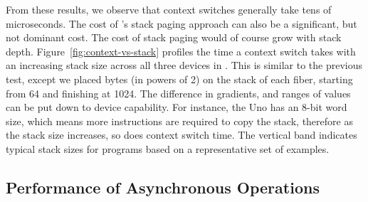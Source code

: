 From these results, we observe that context switches generally take tens of microseconds. The cost of \CON's stack paging approach can also be a significant, but not dominant cost. The cost of stack paging would of course grow with stack depth. Figure~\ref{fig:context-vs-stack} profiles the time a context switch takes with an increasing stack size across all three devices in \CON. This is similar to the previous test, except we placed bytes (in powers of 2) on the stack of each fiber, starting from 64 and finishing at 1024. The difference in gradients, and ranges of values can be put down to device capability. For instance, the Uno has an 8-bit word size, which means more instructions are required to copy the stack, therefore as the stack size increases, so does context switch time. The vertical band indicates typical stack sizes for \MC programs based on a representative set of examples.


\subsection{Performance of Asynchronous Operations}


